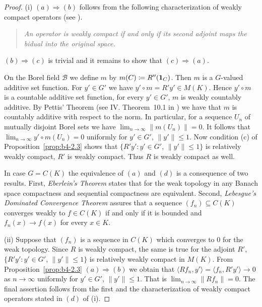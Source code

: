\begin{proof}
(i) $(a)\Rightarrow(b)$ follows from the following characterization of
weakly compact operators (see \eg \textcite[II. Proposition~9.4 ]{schaefer:1974}).
\begin{quote}
    \emph{
    An operator is weakly compact if and only if its second adjoint
    maps the bidual into the original space.
    }
\end{quote}
$(b)\Rightarrow(c)$ is trivial and it remains to show that $(c) \Rightarrow (a)$.

On the Borel field $\mathcal{B}$ we define $m$ by $m(C)  \coloneq  R''(\mathbf{1}_C)$.
Then $m$ is
a $G$-valued additive set function.
For $y' \in G'$ we have
$y'\circ m = R'y' \in M(K)$.
Hence $y'\circ m$ is a countable additive set function, for every $y' \in G'$,  \ie $m$ is weakly countably additive. 
By Pettis' Theorem (see IV. Theorem~10.1 in 
\textcite{dunfordschwartz:1958}) we have
that $m$ is countably additive with respect to the norm.
In particular, for a sequence $U_n$ of mutually disjoint Borel sets we have
$\lim_{n\to\infty}\|m(U_n)\| = 0$.
It follows that $\lim_{n\to\infty}y'\circ m(U_n) = 0$ uniformly for
$y' \in G'$, $\|y'\| \leq 1$.
Now condition (c) of Proposition~\ref{prop:b4-2.3} shows that $\{R'y'
\colon y' \in G'$, $\|y'\| \leq 1\}$ is relatively weakly compact, \ie  $R'$ is
weakly compact.
Thus $R$ is weakly compact as well.

In case $G = C(K)$ the equivalence of\/ $(a)$ and $(d)$ is a consequence of
two results. First, \emph{Eberlein's Theorem} states that for the weak topology in any Banach space compactness and sequential compactness are
equivalent.
Second, \emph{Lebesgue's Dominated Convergence Theorem} assures
that a sequence $(f_n) \subseteq C(K)$ converges weakly to $f \in C(K)$ if and
only if it is bounded and $f_n(x) \to f(x)$ for every $x \in K$.
	
(ii) Suppose that $(f_n)$ is a sequence in $C(K)$ which converges to $0$ for
the weak topology.
Since $R$ is weakly compact, the same is true for
the adjoint $R'$, \ie $\{R'y' \colon y' \in G'$, $\|y'\| \leq 1\}$ is relatively weakly compact in $M(K)$.
From Proposition~\ref{prop:b4-2.3} $(a)\Rightarrow(b)$ we obtain that
$\langle Rf_n,y'\rangle = \langle f_n,R'y'\rangle \to 0$ as $n \to \infty$ uniformly for $y' \in G'$, $\|y'\|\leq1$.
That is $\lim_{n\to\infty}\|Rf_n\| = 0$.
The final assertion follows from the first and the characterization of
weakly compact operators stated in $(d)$ of (i).
\end{proof}
